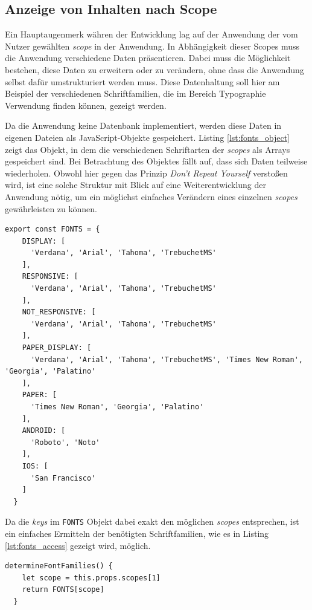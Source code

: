 \subsection{Anzeige von Inhalten nach Scope}
Ein Hauptaugenmerk währen der Entwicklung lag auf der Anwendung der vom Nutzer gewählten \textit{scope} in der Anwendung. In Abhängigkeit dieser Scopes muss die Anwendung verschiedene Daten präsentieren. Dabei muss die Möglichkeit bestehen, diese Daten zu erweitern oder zu verändern, ohne dass die Anwendung selbst dafür umstrukturiert werden muss. Diese Datenhaltung soll hier am Beispiel der verschiedenen Schriftfamilien, die im Bereich Typographie Verwendung finden können, gezeigt werden.

Da die Anwendung keine Datenbank implementiert, werden diese Daten in eigenen Dateien als JavaScript-Objekte gespeichert. Listing \ref{lst:fonts_object} zeigt das Objekt, in dem die verschiedenen Schriftarten der \textit{scopes} als Arrays gespeichert sind. Bei Betrachtung des Objektes fällt auf, dass sich Daten teilweise wiederholen. Obwohl hier gegen das Prinzip \textit{Don’t Repeat Yourself} verstoßen wird, ist eine solche Struktur mit Blick auf eine Weiterentwicklung der Anwendung nötig, um ein möglichst einfaches Verändern eines einzelnen \textit{scopes} gewährleisten zu können.

\begin{lstlisting}[caption=Aufbau des \texttt{FONTS} Objektes, label=lst:fonts_object]
  export const FONTS = {
    DISPLAY: [
      'Verdana', 'Arial', 'Tahoma', 'TrebuchetMS'
    ],
    RESPONSIVE: [
      'Verdana', 'Arial', 'Tahoma', 'TrebuchetMS'
    ],
    NOT_RESPONSIVE: [
      'Verdana', 'Arial', 'Tahoma', 'TrebuchetMS'
    ],
    PAPER_DISPLAY: [
      'Verdana', 'Arial', 'Tahoma', 'TrebuchetMS', 'Times New Roman', 'Georgia', 'Palatino'
    ],
    PAPER: [
      'Times New Roman', 'Georgia', 'Palatino'
    ],
    ANDROID: [
      'Roboto', 'Noto'
    ],
    IOS: [
      'San Francisco'
    ]
  }
\end{lstlisting}

Da die \textit{keys} im \verb|FONTS| Objekt dabei exakt den möglichen \textit{scopes} entsprechen\footnotemark{}, ist ein einfaches Ermitteln der benötigten Schriftfamilien, wie es in Listing \ref{lst:fonts_access} gezeigt wird, möglich.


\begin{lstlisting}[caption=Zugriff auf Werte des \texttt{FONTS} Objektes, label=lst:fonts_access]
  determineFontFamilies() {
    let scope = this.props.scopes[1]
    return FONTS[scope]
  }
\end{lstlisting}


